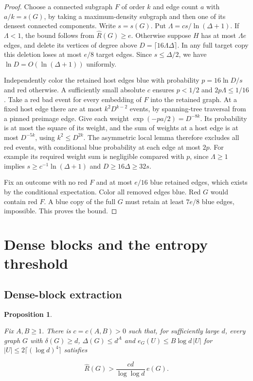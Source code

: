 \documentclass[11pt]{amsart}
\newtheorem{proposition}[theorem]{Proposition}
\theoremstyle{definition}
\theoremstyle{remark}
\numberwithin{equation}{section}
\begin{document}
\begin{proof}

Choose a connected subgraph $F$ of order $ k $ and edge count $ a $ with $ a/k=s(G)$, by taking a maximum-density subgraph and then one of its densest connected components. Write $ s=s(G)$. Put $\Lambda=c s/\ln(\Delta+1)$. If $\Lambda<1$, the bound follows from $\widehat R(G)\ge e $. Otherwise suppose $ H $ has at most $\Lambda e $ edges, and delete its vertices of degree above $ D=\lceil16\Lambda\Delta\rceil $. In any full target copy this deletion loses at most $ e/8$ target edges. Since $ s\le\Delta/2$, we have $\ln D=O(\ln(\Delta+1))$ uniformly.

Independently color the retained host edges blue with probability $p=16\ln D/s $ and red otherwise. A sufficiently small absolute $ c $ ensures $ p<1/2$ and $2p\Lambda\le1/16$. Take a red bad event for every embedding of $ F $ into the retained graph. At a fixed host edge there are at most $ k^2D^{k-2}$ events, by spanning-tree traversal from a pinned preimage edge. Give each weight $\exp(-pa/2)=D^{-8k}$. Its probability is at most the square of its weight, and the sum of weights at a host edge is at most $ D^{-5k}$, using $ k^2\le D^{2k}$. The asymmetric local lemma therefore excludes all red events, with conditional blue probability at each edge at most $2p $.  For example its required weight sum is negligible compared with $ p $, since $\Lambda\ge1$ implies $ s\ge c^{-1}\ln(\Delta+1)$ and $ D\ge16\Delta\ge32s$.

Fix an outcome with no red $F $ and at most $ e/16$ blue retained edges, which exists by the conditional expectation. Color all removed edges blue. Red $ G $ would contain red $ F $. A blue copy of the full $ G $ must retain at least $7e/8$ blue edges, impossible. This proves the bound.

\end{proof}

\section{Dense blocks and the entropy threshold}\label{sec:blocks}

\subsection{Dense-block extraction}

\begin{proposition}\label{prop:dense-blocks}

Fix $A,B\ge1$. There is $ c=c(A,B)>0$ such that, for sufficiently large $ d $, every graph $ G $ with $\delta(G)\ge d $, $\Delta(G)\le d^A $ and $ e_G(U)\le B\log d\,|U|$ for $|U|\le2\lceil(\log d)^4\rceil$ satisfies

\begin{equation}
\widehat R(G)>\frac{cd}{\log\log d}\,e(G).
\end{equation}

\end{proposition}
\end{document}
